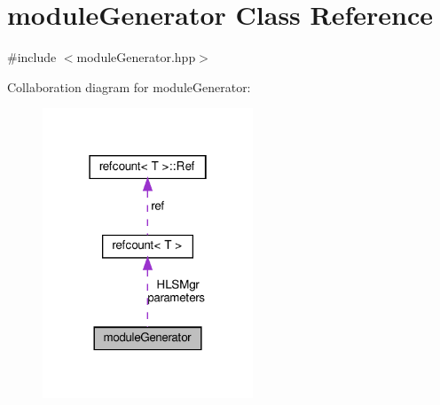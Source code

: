 \hypertarget{classmoduleGenerator}{}\section{module\+Generator Class Reference}
\label{classmoduleGenerator}


{\ttfamily \#include $<$module\+Generator.\+hpp$>$}



Collaboration diagram for module\+Generator\+:
\nopagebreak
\begin{figure}[H]
\begin{center}
\leavevmode
\includegraphics[width=178pt]{d2/da0/classmoduleGenerator__coll__graph}
\end{center}
\end{figure}

